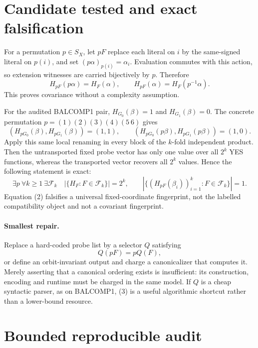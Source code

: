 \documentclass[11pt]{article}
\begin{document}
\section{Candidate tested and exact falsification}

For a permutation $p\in S_X$, let $pF$ replace each literal on $i$ by the same-signed
literal on $p(i)$, and set $(p\alpha)_{p(i)}=\alpha_i$.  Evaluation commutes with this
action, so extension witnesses are carried bijectively by $p$.  Therefore
\[
\tag{1} H_{pF}(p\alpha)=H_F(\alpha),
\qquad
H_{pF}(\alpha)=H_F(p^{-1}\alpha).
\]
This proves covariance without a complexity assumption.

For the audited BALCOMP1 pair, $H_{G_0}(\beta)=1$ and $H_{G_1}(\beta)=0$.  The concrete
permutation $p=(1)(2)(3)(4)(5\ 6)$ gives
\[
 (H_{pG_0}(\beta),H_{pG_1}(\beta))=(1,1),
 \qquad
 (H_{pG_0}(p\beta),H_{pG_1}(p\beta))=(1,0).
\]
Apply this same local renaming in every block of the $k$-fold independent product.  Then
the untransported fixed probe vector has only one value over all $2^k$ YES functions,
whereas the transported vector recovers all $2^k$ values.  Hence the following statement
is exact:
\[
\tag{2}
\exists p\ \forall k\ge1\ \exists \mathcal F_k\quad
 |\{H_F:F\in\mathcal F_k\}|=2^k,
 \qquad
 |\{(H_{pF}(\beta_i))_{i=1}^k:F\in\mathcal F_k\}|=1.
\]
Equation (2) falsifies a universal fixed-coordinate fingerprint, not the labelled
compatibility object and not a covariant fingerprint.

\paragraph{Smallest repair.}
Replace a hard-coded probe list by a selector $Q$ satisfying
\[
\tag{3} Q(pF)=pQ(F),
\]
or define an orbit-invariant output and charge a canonicalizer that computes it.  Merely
asserting that a canonical ordering exists is insufficient: its construction, encoding
and runtime must be charged in the same model.  If $Q$ is a cheap syntactic parser, as on
BALCOMP1, (3) is a useful algorithmic shortcut rather than a lower-bound resource.

\section{Bounded reproducible audit}
\end{document}
